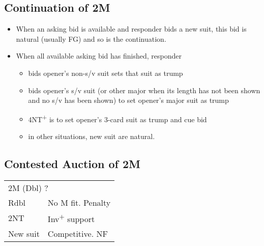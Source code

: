 \documentclass{article}
\renewcommand{\sp}{\ensuremath\spadesuit}
\newcommand{\he}{\ensuremath\heartsuit}
\newcommand{\di}{\ensuremath\diamondsuit}
\newcommand{\nt}{\relsize{-1}NT\relsize{1}}
\newcommand{\up}{\textsuperscript{+}}
\newcommand{\down}{\textsuperscript{-}}
\begin{document}

\subsection{Continuation of 2M}

\begin{itemize}
	\item When an asking bid is available and responder bids a new suit, this bid is natural (usually FG) and so is the continuation. 
    \item When all available asking bid has finished, responder
    \begin{itemize}
    	\item bids opener's non-s/v suit sets that suit as trump
			\item bids opener's s/v suit (or other major when its length has not been shown and no s/v has been shown) to set opener's major suit as trump
			\item 4\nt\up{} is to set opener's 3-card suit as trump and cue bid 
			\item in other situations, new suit are natural.
    \end{itemize}
\end{itemize}

\subsection{Contested Auction of 2M}

\begin{tabular}{|l|p{6.5cm}}
	\multicolumn{2}{l}{2M{} (Dbl) ?}\\
	Rdbl & No M fit. Penalty \\
	2\nt{} & Inv\up{} support \\
	New suit & Competitive. NF
\end{tabular}\\\\
\end{document}
